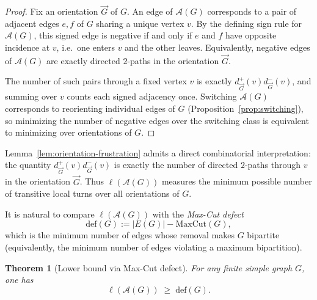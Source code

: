 \documentclass[11pt]{article}
\newtheorem{theorem}{Theorem}
\theoremstyle{plain}
\begin{document}
\begin{proof}
Fix an orientation $\vec G$ of $G$.
An edge of $\mathcal A(G)$ corresponds to a pair of adjacent edges $e,f$ of $G$
sharing a unique vertex $v$.
By the defining sign rule for $\mathcal A(G)$, this signed edge is negative if and
only if $e$ and $f$ have opposite incidence at $v$, i.e.\ one enters $v$ and the
other leaves.
Equivalently, negative edges of $\mathcal A(G)$ are exactly directed $2$-paths in
the orientation $\vec G$.

The number of such pairs through a fixed vertex $v$ is exactly
$d^+_{\vec G}(v)d^-_{\vec G}(v)$, and summing over $v$ counts each signed
adjacency once.
Switching $\mathcal A(G)$ corresponds to reorienting individual edges of $G$
(Proposition~\ref{prop:switching}), so minimizing the number of negative edges
over the switching class is equivalent to minimizing over orientations of $G$.
\end{proof}
\medskip

Lemma~\ref{lem:orientation-frustration} admits a direct combinatorial
interpretation: the quantity $d^+_{\vec G}(v)d^-_{\vec G}(v)$ is exactly the
number of directed $2$-paths through $v$ in the orientation $\vec G$.
Thus $\ell(\mathcal A(G))$ measures the minimum possible number of transitive
local turns over all orientations of $G$.

It is natural to compare $\ell(\mathcal A(G))$ with the \emph{Max-Cut defect}
\[
\mathrm{def}(G):=|E(G)|-\mathrm{MaxCut}(G),
\]
which is the minimum number of edges whose removal makes $G$ bipartite
(equivalently, the minimum number of edges violating a maximum bipartition).


\begin{theorem}[Lower bound via Max-Cut defect]\label{thm:frustration-lower}
For any finite simple graph $G$, one has
\[
\ell(\mathcal A(G)) \;\ge\; \mathrm{def}(G).
\]
\end{theorem}
\end{document}
